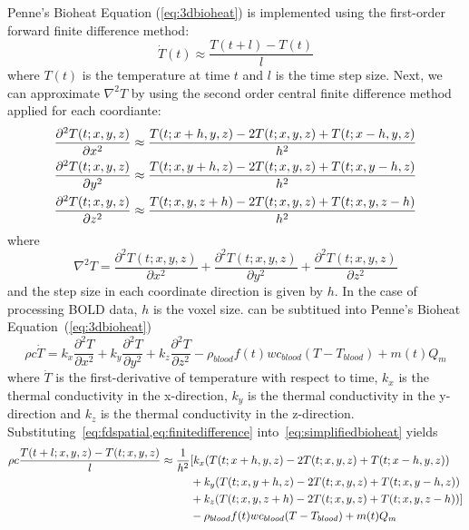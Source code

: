     Penne's Bioheat Equation (\cref{eq:3dbioheat}) is implemented using the first-order forward finite difference method:
    \begin{equation}
      \label{eq:finitedifference}
      \dot{T}(t) \approx \frac{T(t+l)-T(t)}{l}
    \end{equation}
    where $T(t)$ is the temperature at time $t$ and $l$ is the time step size. Next, we can approximate $\nabla^{2} T$ by using the second order central finite difference method applied for each coordiante:
    \begin{align}
      \frac{\partial^2T(t;x,y,z)}{\partial x^2} &\approx \frac{T(t;x+h,y,z)-2 T(t;x,y,z)+T(t;x-h,y,z)}{h^2} \notag\\
      \frac{\partial^2T(t;x,y,z)}{\partial y^2} &\approx \frac{T(t;x,y+h,z)-2 T(t;x,y,z)+T(t;x,y-h,z)}{h^2} \notag\\
      \frac{\partial^2T(t;x,y,z)}{\partial z^2} &\approx \frac{T(t;x,y,z+h)-2 T(t;x,y,z)+T(t;x,y,z-h)}{h^2}\label{eq:fdspatial}
    \end{align}
where 
  \begin{equation}
    \label{eq:leplaceT}
    \nabla^{2} T = 
    \frac{\partial^2T(t;x,y,z)}{\partial x^2} + 
    \frac{\partial^2T(t;x,y,z)}{\partial y^2} + 
    \frac{\partial^2T(t;x,y,z)}{\partial z^2}
  \end{equation}
and the step size in each coordinate direction is given by $h$.  In the case of processing BOLD data, $h$ is the voxel size.
 can be subtitued into Penne's Bioheat Equation~(\cref{eq:3dbioheat})
  \begin{equation}
    \rho c \dot{T} = k_x \frac{\partial^2 T}{\partial x^2} + k_y \frac{\partial^2 T}{\partial y^2} + k_z \frac{\partial^2 T}{\partial z^2} -\rho_{blood}f(t)wc_{blood}(T-T_{blood})+m(t)Q_{m} \label{eq:simplifiedbioheat}
  \end{equation}
  where $\dot{T}$ is the first-derivative of temperature with respect to time, $k_x$ is the thermal conductivity in the x-direction, $k_y$ is the thermal conductivity in the y-direction and $k_z$ is the thermal conductivity in the z-direction.
  Substituting~\cref{eq:fdspatial,eq:finitedifference} into~\cref{eq:simplifiedbioheat} yields
  \begin{align}
    \rho c \frac{T(t+l;x,y,z)-T(t;x,y,z)}{l} \approx \frac{1}{h^2} 
    & [k_x (T(t;x+h,y,z)-2 T(t;x,y,z)+T(t;x-h,y,z)) \notag\\
    & + k_y (T(t;x,y+h,z)-2 T(t;x,y,z)+T(t;x,y-h,z))\notag\\
    & + k_z (T(t;x,y,z+h)-2 T(t;x,y,z)+T(t;x,y,z-h))]\notag\\
    & -\rho_{blood}f(t)wc_{blood}(T-T_{blood})+m(t)Q_{m}
  \end{align}
